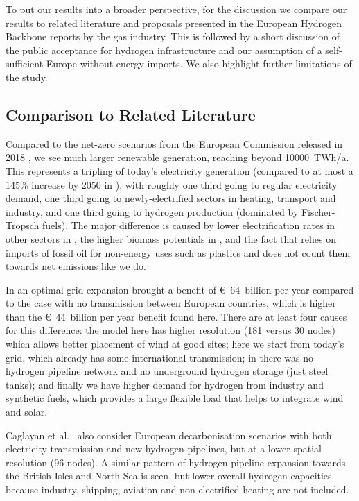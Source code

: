 To put our results into a broader perspective, for the discussion we compare our
results to related literature and proposals presented in the European Hydrogen
Backbone reports by the gas industry. This is followed by a short discussion of
the public acceptance for hydrogen infrastructure and our assumption of a
self-sufficient Europe without energy imports. We also highlight further
limitations of the study.

\subsection*{Comparison to Related Literature}

Compared to the net-zero scenarios from the European Commission released in 2018
\cite{in-depth_2018}, we see much larger renewable generation, reaching beyond
10000~TWh/a. This represents a tripling
of today's electricity generation (compared to at most a 145\% increase by 2050
in \cite{in-depth_2018}), with roughly one third going to regular electricity
demand, one third going to newly-electrified sectors in heating, transport and
industry, and one third going to hydrogen production (dominated by
Fischer-Tropsch fuels). The major difference is caused by lower electrification
rates in other sectors in \cite{in-depth_2018}, the higher biomass potentials in
\cite{in-depth_2018}, and the fact that \cite{in-depth_2018} relies on imports
of fossil oil for non-energy uses such as plastics and does not count them
towards net emissions like we do.

In \cite{brownSynergiesSector2018} an optimal grid expansion brought a benefit
of \euro~64~billion per year compared to the case with no transmission between
European countries, which is higher than the \euro~44~billion per year benefit
found here. There are at least four causes for this difference: the model here
has higher resolution (181 versus 30 nodes) which allows better placement of
wind at good sites; here we start from today's grid, which already has some
international transmission; in \cite{brownSynergiesSector2018} there was no
hydrogen pipeline network and no underground hydrogen storage (just steel
tanks); and finally we have higher demand for hydrogen from industry and
synthetic fuels, which provides a large flexible load that helps to integrate
wind and solar.

Caglayan et al.~\cite{Caglayan2019} also consider European decarbonisation
scenarios with both electricity transmission and new hydrogen pipelines, but at
a lower spatial resolution (96 nodes). A similar pattern of hydrogen pipeline
expansion towards the British Isles and North Sea is seen, but lower overall
hydrogen capacities because industry, shipping, aviation and non-electrified
heating are not included.

